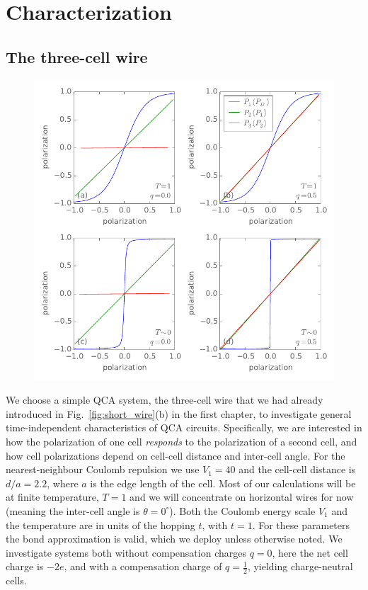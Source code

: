 \chapter{Characterization}
\graphicspath{{../gfx/chapter03/}{../plots/chapter03/}}


\section{The three-cell wire}

%
\begin{figure}
  \center
  \includegraphics{three_cells_PP}
  \caption{
  }
  \label{fig:three_cells_PP}
\end{figure}
%
We choose a simple QCA system, the three-cell wire that we had already
introduced in Fig.~\ref{fig:short_wire}(b) in the first chapter, to investigate
general time-independent characteristics of QCA circuits. Specifically, we are
interested in how the polarization of one cell \emph{responds} to the
polarization of a second cell, and how cell polarizations depend on cell-cell
distance and inter-cell angle. For the nearest-neighbour Coulomb repulsion we
use $V_1 = 40$ and the cell-cell distance is $d/a = 2.2$, where $a$ is the edge
length of the cell. Most of our calculations will be at finite temperature, $T =
1$ and we will concentrate on horizontal wires for now (meaning the inter-cell
angle is $\theta = 0^{\circ}$). Both the Coulomb energy scale $V_1$ and the
temperature are in units of the hopping $t$, with $t = 1$.  For these parameters
the bond approximation is valid, which we deploy unless otherwise noted. We
investigate systems both without compensation charges $q = 0$, here the net cell
charge is $- 2 e$, and with a compensation charge of $q=\frac{1}{2}$, yielding
charge-neutral cells.

